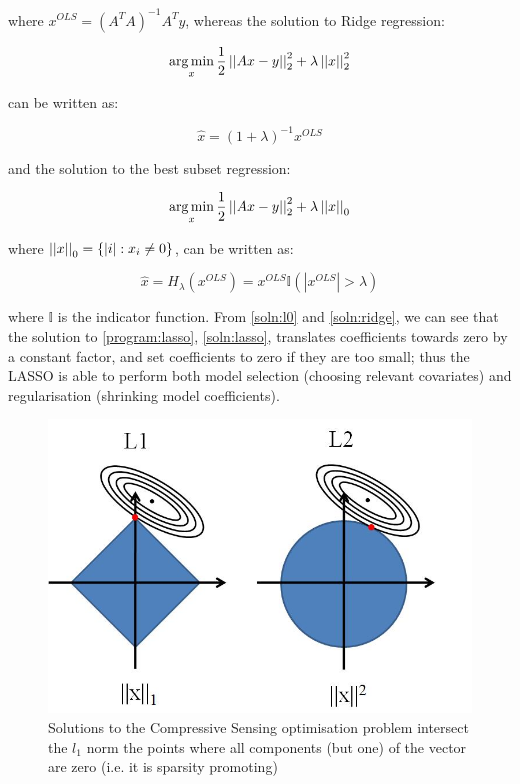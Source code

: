 \documentclass[12pt]{report}
\begin{document}
where \(x^{OLS} = (A^TA)^{-1}A^Ty \), whereas the solution to Ridge regression:

\begin{equation}
\operatorname*{arg\,min}_x \frac{1}{2}\left|\left|Ax-y\right|\right|_2^2 + \lambda\left|\left|x\right|\right|_2^2
\label{program:ridge}
\end{equation}

can be written as:

\begin{equation}
\hat{x} = \left(1+\lambda\right)^{-1}x^{OLS}
\label{soln:ridge}
\end{equation}

and the solution to the best subset regression:

\begin{equation}
\operatorname*{arg\,min}_x \frac{1}{2}\left|\left|Ax-y\right|\right|_2^2 + \lambda\left|\left|x\right|\right|_0
\label{program:ell0}
\end{equation}

where \( \left|\left|x\right|\right|_0 = \{ |i| : x_i \neq 0 \} \), can be written as:

\begin{equation}
\hat{x} = H_{\lambda}\left(x^{OLS}\right) = x^{OLS} \mathbb{I}\left(|x^{OLS}| > \lambda\right)
\label{soln:l0}
\end{equation} 

where \(\mathbb{I}\) is the indicator function. From \eqref{soln:l0} and \eqref{soln:ridge}, we can see that the solution to \eqref{program:lasso}, \eqref{soln:lasso}, translates coefficients towards zero by a constant factor, and set coefficients to zero if they are too small; thus the LASSO is able to perform both model selection (choosing relevant covariates) and regularisation (shrinking model coefficients). 

\begin{figure}[h]
\centering
\includegraphics[height = 7 cm]{l1l2.jpg}
\caption{Solutions to the Compressive Sensing optimisation problem intersect the \(l_1\) norm the points where all components (but one) of the vector are zero (i.e. it is sparsity promoting) \cite{Tibshirani1996}}
\label{fig:l1l2}
\end{figure}
\end{document}
